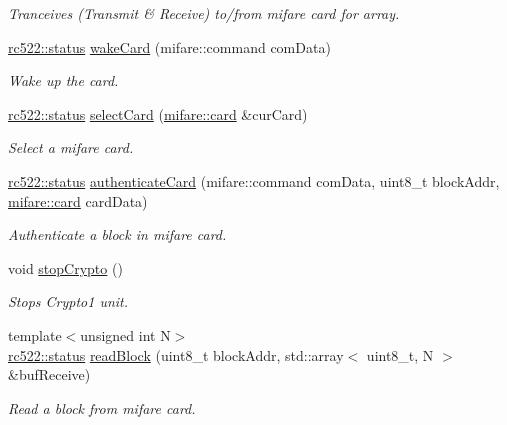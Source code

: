 \begin{DoxyCompactItemize}
\begin{DoxyCompactList}\small\item\em Tranceives (Transmit \& Receive) to/from mifare card for array. \end{DoxyCompactList}\item 
\hyperlink{classspiReader_a4bcf984823c38cf4841ebf619e788790}{rc522\+::status} \hyperlink{classrc522_a998688cd59ae05add31c7c6847bf02ae}{wake\+Card} (mifare\+::command com\+Data)
\begin{DoxyCompactList}\small\item\em Wake up the card. \end{DoxyCompactList}\item 
\hyperlink{classspiReader_a4bcf984823c38cf4841ebf619e788790}{rc522\+::status} \hyperlink{classrc522_a5016ad241df63301c261709debcb274b}{select\+Card} (\hyperlink{classmifare_1_1card}{mifare\+::card} \&cur\+Card)
\begin{DoxyCompactList}\small\item\em Select a mifare card. \end{DoxyCompactList}\item 
\hyperlink{classspiReader_a4bcf984823c38cf4841ebf619e788790}{rc522\+::status} \hyperlink{classrc522_a9cba68c4fff6e1acf8bf9b2601197d96}{authenticate\+Card} (mifare\+::command com\+Data, uint8\+\_\+t block\+Addr, \hyperlink{classmifare_1_1card}{mifare\+::card} card\+Data)
\begin{DoxyCompactList}\small\item\em Authenticate a block in mifare card. \end{DoxyCompactList}\item 
void \hyperlink{classrc522_a0f15a1c190dcde40f314ff4f6ffb65e4}{stop\+Crypto} ()
\begin{DoxyCompactList}\small\item\em Stops Crypto1 unit. \end{DoxyCompactList}\item 
{\footnotesize template$<$unsigned int N$>$ }\\\hyperlink{classspiReader_a4bcf984823c38cf4841ebf619e788790}{rc522\+::status} \hyperlink{classrc522_a87dfbf9cf9707a675c91981c92c93fdc}{read\+Block} (uint8\+\_\+t block\+Addr, std\+::array$<$ uint8\+\_\+t, N $>$ \&buf\+Receive)
\begin{DoxyCompactList}\small\item\em Read a block from mifare card. \end{DoxyCompactList}\item 

\end{DoxyCompactItemize}
